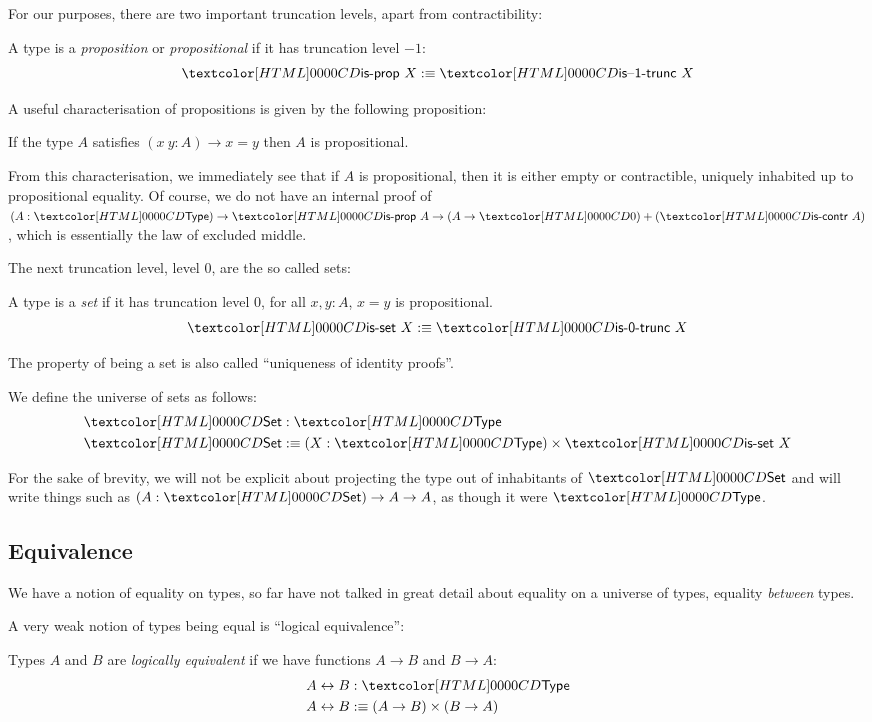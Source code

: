 For our purposes, there are two important truncation levels, apart
from contractibility:
\begin{definition}
  A type is a \emph{proposition} or \emph{propositional} if it has
  truncation level $-1$:
  $$
  \isprop\ X \ddefeq \istrunc{-1}\ X
  $$
\end{definition}

A useful characterisation of propositions is given by the following
proposition:
\begin{proposition}
  \label{prop:forall-prop}
  If the type $A$ satisfies $(x\ y : A) \to x = y$ then $A$ is
  propositional.
\end{proposition}
From this characterisation, we immediately see that if $A$ is
propositional, then it is either empty or contractible, \ie uniquely
inhabited up to propositional equality. Of course, we do not have an
internal proof of
$(A : \Type) \to \isprop\ A \to (A \to \emptyty) + (\iscontr\ A)$,
which is essentially the law of excluded middle.

The next truncation level, level $0$, are the so called sets:
\begin{definition}
  A type is a \emph{set} if it has truncation level $0$, \ie for all
  $x, y : A$, $x = y$ is propositional.
  $$
  \isset\ X \ddefeq \istrunc{0}\ X
  $$
\end{definition}
The property of being a set is also called ``uniqueness of identity
proofs''.
\begin{definition}
  We define the universe of sets as follows:
  \begin{align*}
    &\Set : \Type \\
    &\Set \ddefeq (X : \Type) \times \isset\ X
  \end{align*}
\end{definition}

For the sake of brevity, we will not be explicit about projecting the
type out of inhabitants of $\Set$ and will write things such as
$(A : \Set) \to A \to A$, as though it were $\Type$.

\subsection{Equivalence}

We have a notion of equality on types, so far have not talked in great
detail about equality on a universe of types, \ie equality
\emph{between} types.

A very weak notion of types being equal is ``logical equivalence'':
\begin{definition}
  Types $A$ and $B$ are \emph{logically equivalent} if we have
  functions $A \to B$ and $B \to A$:
  \begin{align*}
    &A \logequiv B : \Type \\
    &A \logequiv B \ddefeq (A \to B) \times (B \to A)
  \end{align*}
\end{definition}

